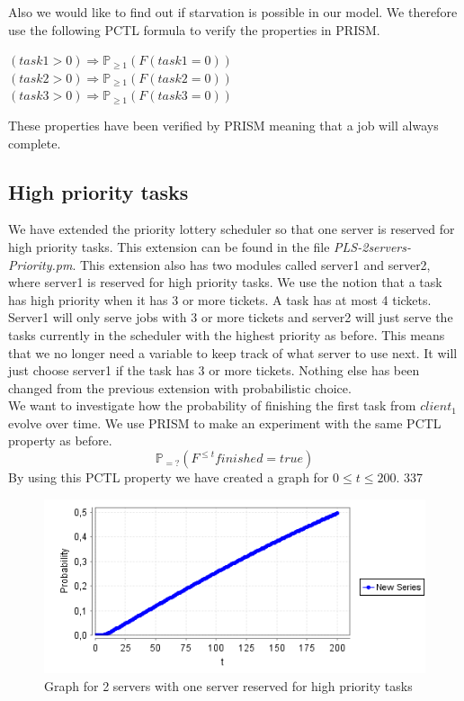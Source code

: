 \documentclass[12pt]{report}
\begin{document}
Also we would like to find out if starvation is possible in our model. We therefore use the following PCTL formula to verify the properties in PRISM.
\begin{center}
$(task1 > 0) \Rightarrow \mathbb{P}_{\geq 1}(F(task1 = 0))$\\
$(task2 > 0) \Rightarrow \mathbb{P}_{\geq 1}(F(task2 = 0))$\\
$(task3 > 0) \Rightarrow \mathbb{P}_{\geq 1} (F(task3 = 0))$
\end{center}
These properties have been verified by PRISM meaning that a job will always complete.

\subsection*{High priority tasks}
We have extended the priority lottery scheduler so that one server is reserved for high priority tasks. This extension can be found in the file \emph{PLS-2servers-Priority.pm}. This extension also has two modules called server1 and server2, where server1 is reserved for high priority tasks. We use the notion that a task has high priority when it has 3 or more tickets. A task has at most 4 tickets. Server1 will only serve jobs with 3 or more tickets and server2 will just serve the tasks currently in the scheduler with the highest priority as before. This means that we no longer need a variable to keep track of what server to use next. It will just choose server1 if the task has 3 or more tickets. Nothing else has been changed from the previous extension with probabilistic choice. 
\\
We want to investigate how the probability of finishing the first task from $client_1$ evolve over time. We use PRISM to make an experiment with the same PCTL property as before.
$$\mathbb{P}_{=?}( F^{\leq t} finished=true)$$
By using this PCTL property we have created a graph for $0 \leq t \leq 200$. 337
\begin{figure}[H]
	\begin{center}
		\includegraphics[scale=0.75]{../GFX/C2.png}
	\end{center}
	\caption{Graph for 2 servers with one server reserved for high priority tasks}
\end{figure}
\end{document}
